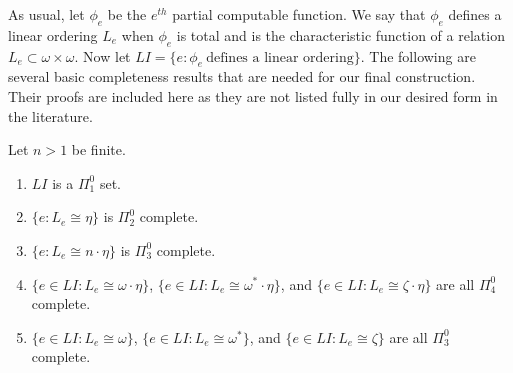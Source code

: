 \documentclass[11pt]{amsart}
\theoremstyle{definition}
\begin{document}
As usual, let $\phi_e$ be the $e^{th}$
 partial computable function. We say that $\phi_e$ defines a linear ordering $L_e$ when $\phi_e$ is total and is the characteristic function of a relation $L_e \subset \omega \times \omega$.  
Now let $LI = \{e: \phi_e\ \text{defines a linear ordering}\}$.
The following are several basic completeness results that are needed for our final construction. 
Their proofs are included here as they are not listed fully in our desired form in the literature.

\begin{proposition} \label{Le1} Let $n>1$ be finite.
\begin{enumerate}
\item $LI$ is a $\Pi^0_1$ set.
\item $\{e: L_e \cong \eta\}$ is $\Pi^0_2$ complete.
\item  $\{e: L_e \cong n \cdot \eta\}$ is $\Pi^0_3$ complete.
\item $\{e \in LI: L_e \cong \omega \cdot \eta \}$,  $\{e \in LI: L_e \cong \omega^* \cdot \eta \}$, and $\{e \in LI: L_e \cong \zeta \cdot \eta\}$ are all $\Pi^0_4$ complete.
\item $\{e \in LI: L_e \cong \omega\}$,  $\{e \in LI: L_e \cong \omega^*\}$, and $\{e \in LI: L_e \cong \zeta\}$ are all $\Pi^0_3$ complete.
\end{enumerate}
\end{proposition}
\end{document}
